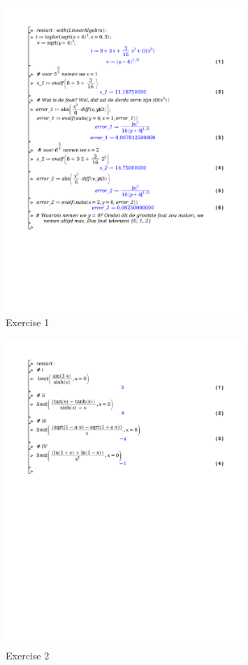 \documentclass[a4paper]{report}
\begin{document}
\begin{figure}[!htbp]
	\centering
	\includegraphics[width=0.8\textwidth]{./exercises/huis_1_ex_1.pdf}
	\caption{Exercise 1}
\end{figure}

\begin{figure}[!htbp]
	\centering
	\includegraphics[width=0.8\textwidth]{./exercises/huis_1_ex_2.pdf}
	\caption{Exercise 2}
\end{figure}
\end{document}
